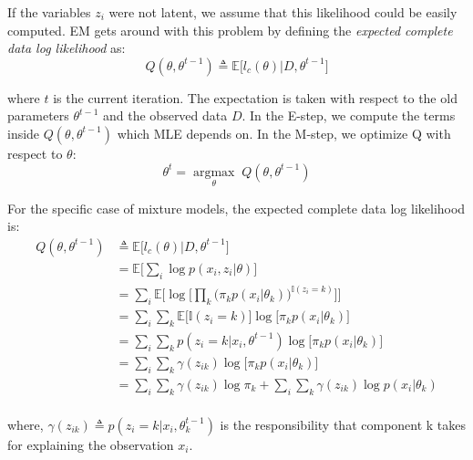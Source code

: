 If the variables $z_{i}$ were not latent, we assume that this likelihood could be easily computed. EM gets around with this problem by defining the \emph{expected complete data log likelihood} as:
\begin{equation} \label{log-lik-expected-f}
		Q(\theta, \theta^{t-1}) \triangleq \mathbb{E} \big[l_{c}(\theta) | D, \theta^{t-1}\big]
\end{equation}

where $t$ is the current iteration. The expectation is taken with respect to the old parameters $\theta^{t-1}$ and the observed data $D$. In the E-step, we compute the terms inside $Q(\theta, \theta^{t-1})$ which MLE depends on. In the M-step, we optimize Q with respect to $\theta$:
\begin{equation} \label{log-lik-observed-f}
	\theta^{t} = \underset{\theta}{\operatorname{argmax}} \; Q(\theta, \theta^{t-1})
\end{equation}

For the specific case of mixture models, the expected complete data log likelihood is:
\begin{equation} \label{log-lik-expected-f}
	\begin{split}
		Q(\theta, \theta^{t-1}) & \triangleq \mathbb{E} \big[l_{c}(\theta) | D, \theta^{t-1}\big] \\
								& = \mathbb{E} \bigg[ \sum_{i} \log p(x_{i}, z_{i}|\theta) \bigg] \\
								& = \sum_{i} \mathbb{E} \bigg[ \log \bigg[\prod_{k} \big( \pi_{k}p(x_{i}|\theta_{k})\big)^{\mathbb{I}(z_{i}=k)} \bigg]\bigg] \\
								& = \sum_{i} \sum_{k} \mathbb{E} \big[\mathbb{I}(z_{i}=k)\big] \log \big[\pi_{k}p(x_{i}|\theta_{k})\big] \\
								& = \sum_{i} \sum_{k} p(z_{i}=k|x_{i},\theta^{t-1}) \log \big[\pi_{k}p(x_{i}|\theta_{k})\big] \\
								& = \sum_{i} \sum_{k} \gamma(z_{ik}) \log \big[\pi_{k}p(x_{i}|\theta_{k})\big] \\
								& = \sum_{i} \sum_{k} \gamma(z_{ik}) \log \pi_{k} + \sum_{i} \sum_{k} \gamma(z_{ik}) \log p(x_{i}|\theta_{k}) \\		
	\end{split}
\end{equation}

where, $\gamma(z_{ik}) \triangleq p(z_{i}=k|x_{i},\theta_{k}^{t-1})$ is the responsibility that component k takes for explaining the observation $x_{i}$.

